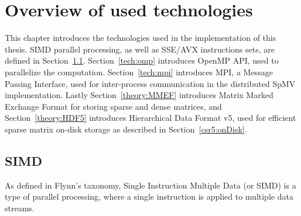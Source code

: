 \documentclass[thesis=M,english]{FITthesis}[2019/12/23]
\begin{document}
\chapter{Overview of used technologies}\label{tech}

This chapter introduces the technologies used in the implementation of this thesis.
SIMD parallel processing, as well as SSE/AVX instructions sets, are defined in Section~\ref{tech:simd}.
Section~\ref{tech:omp} introduces OpenMP API, used to parallelize the computation.
Section~\ref{tech:mpi} introduces MPI, a Message Passing
Interface, used for inter-process communication in the distributed SpMV implementation.  Lastly
Section~\ref{theory:MMEF} introduces Matrix Marked Exchange Format for storing sparse and dense matrices,
and Section~\ref{theory:HDF5} introduces Hierarchical Data Format v5, used for efficient sparse matrix
on-disk storage as described in Section~\ref{csr5:onDisk}.


\section{SIMD}\label{tech:simd}

As defined in Flynn's taxonomy, Single Instruction Multiple Data (or SIMD) is a type of parallel
processing, where a single instruction is applied to multiple data streams.
\end{document}
